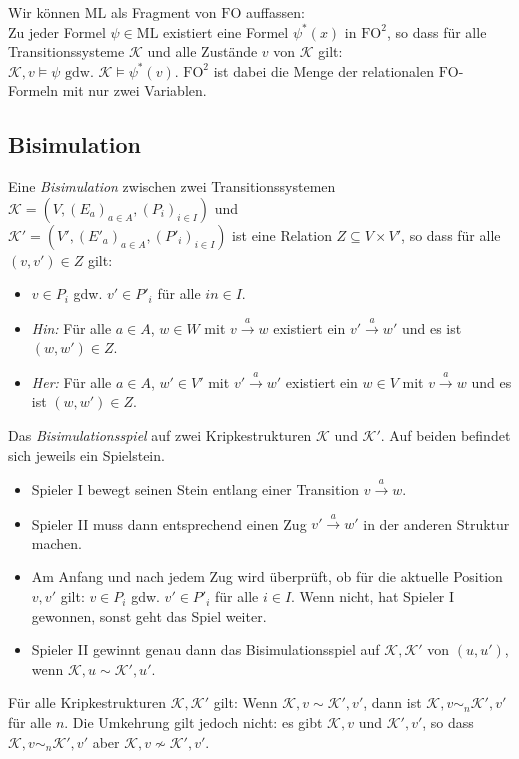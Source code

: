 \documentclass{panikzettel}
\newcommand{\FO}{\mathrm{FO}}
\newcommand{\K}{\mathcal{K}}
\newcommand{\ML}{\mathrm{ML}}
\begin{document}
Wir können $\ML$ als Fragment von $\FO$ auffassen: \\
Zu jeder Formel $\psi \in \ML$ existiert eine Formel $\psi^\ast(x)$ in $\FO^2$, so dass für alle Transitionssysteme $\K$ und alle Zustände $v$ von $\K$ gilt:
$\K,v \models \psi \text{ gdw.\ }\K \models \psi^\ast(v)$.
$\FO^2$ ist dabei die Menge der relationalen $\FO$-Formeln mit nur zwei Variablen.

\subsection{Bisimulation}

Eine \emph{Bisimulation} zwischen zwei Transitionssystemen $\K = (V, (E_a)_{a \in A}, (P_i)_{i \in I})$ und\\ $\K' = (V', (E'_a)_{a \in A}, (P'_i)_{i \in I})$ ist eine Relation $Z \subseteq V \times  V'$, so dass für alle $(v, v') \in Z$ gilt:

\begin{itemize}
  \item $v \in P_i$ gdw. $v' \in P'_i$ für alle $in \in I$.
  \item \emph{Hin:} Für alle $a \in A$, $w \in W$ mit $v \overset{a}{\to} w$ existiert ein $v' \overset{a}{\to} w'$ und es ist $(w, w') \in Z$.
  \item \emph{Her:} Für alle $a \in A$, $w' \in V'$ mit $v' \overset{a}{\to} w'$ existiert ein $w \in V$ mit $v \overset{a}{\to} w$ und es ist $(w, w') \in Z$.
\end{itemize}

Das \emph{Bisimulationsspiel} auf zwei Kripkestrukturen $\K$ und $\K'$.
Auf beiden befindet sich jeweils ein Spielstein.
\begin{itemize}
\item[] Spieler I bewegt seinen Stein entlang einer Transition $v \overset{a}{\to} w$.
\item[] Spieler II muss dann entsprechend einen Zug $v' \overset{a}{\to} w'$ in der anderen Struktur machen.
\item[] Am Anfang und nach jedem Zug wird überprüft, ob für die aktuelle Position $v, v'$ gilt: $v \in P_i$ gdw. $v' \in P'_i$ für alle $i \in I$. Wenn nicht, hat Spieler I gewonnen, sonst geht das Spiel weiter.
\item[] Spieler II gewinnt genau dann das Bisimulationsspiel auf $\K, \K'$ von $(u,u')$, wenn $\K, u \sim \K', u'$.
\end{itemize}

Für alle Kripkestrukturen $\K, \K'$ gilt: Wenn $\K, v \sim \K', v'$, dann ist $\K, v \sim_n \K', v'$ für alle $n$. Die Umkehrung gilt jedoch nicht: es gibt $\K, v$ und $\K', v'$, so dass $\K, v \sim_n \K', v'$ aber $\K, v \not\sim \K', v'$.
\end{document}
